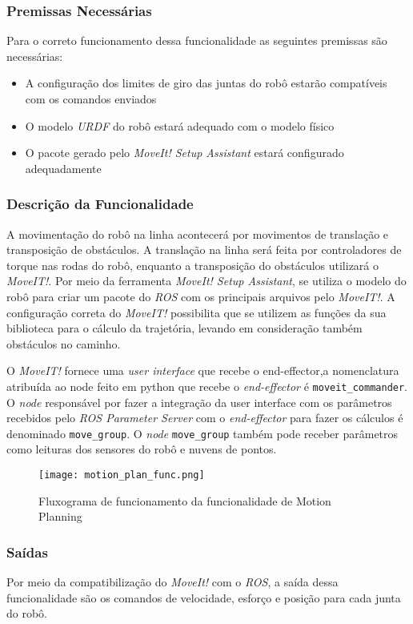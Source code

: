 \subsubsection{Premissas Necessárias}
Para o correto funcionamento dessa funcionalidade as seguintes premissas são necessárias:
\begin{itemize}
	\item A configuração dos limites de giro das juntas do robô estarão compatíveis com os comandos enviados
	\item O modelo \textit{URDF} do robô estará adequado com o modelo físico
	\item O pacote gerado pelo \textit{MoveIt! Setup Assistant} estará configurado adequadamente
\end{itemize}
\subsubsection{Descrição da Funcionalidade}
A movimentação do robô na linha acontecerá por movimentos de translação e transposição de obstáculos. A translação na linha será feita por controladores de torque nas rodas do robô, enquanto a transposição do obstáculos utilizará o \textit{MoveIT!}.
Por meio da ferramenta \textit{MoveIt! Setup Assistant}, se utiliza o modelo do robô para criar um pacote do \textit{ROS} com os principais arquivos pelo \textit{MoveIT!}. 
A configuração correta do \textit{MoveIT!} possibilita que se utilizem as funções da sua biblioteca para o cálculo da trajetória, levando em consideração também obstáculos no caminho.

O \textit{MoveIT!} fornece uma \textit{user interface} que recebe o end-effector,a nomenclatura atribuída ao node feito em python que recebe o \textit{end-effector} é \verb|moveit_commander|. O  \textit{node} responsável por fazer a integração da user interface com os parâmetros recebidos pelo \textit{ROS Parameter Server} com o \textit{end-effector} para fazer os cálculos é denominado \verb|move_group|. O \textit{node} \verb|move_group| também pode receber parâmetros como leituras dos sensores do robô e nuvens de pontos.

\begin{figure}[H]
	\centering
	\texttt{[image: motion\_plan\_func.png]}
	\caption{Fluxograma de funcionamento da funcionalidade de Motion Planning}
	\label{fig:flux_motion}
\end{figure}

\subsubsection{Saídas}
Por meio da compatibilização do \textit{MoveIt!} com o \textit{ROS}, a saída dessa funcionalidade são os comandos de velocidade, esforço e posição para cada junta do robô.

